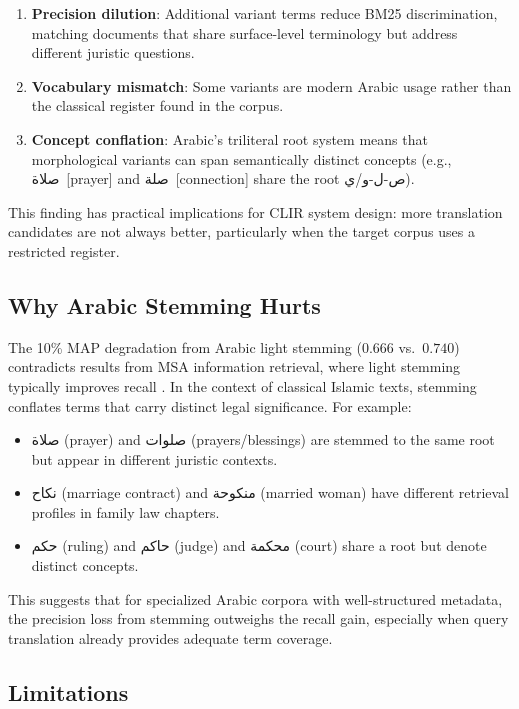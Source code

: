 \documentclass[preprint,12pt,authoryear]{elsarticle}
\begin{document}
\begin{enumerate}
    \item \textbf{Precision dilution}: Additional variant terms reduce BM25 discrimination, matching documents that share surface-level terminology but address different juristic questions.

    \item \textbf{Vocabulary mismatch}: Some variants are modern Arabic usage rather than the classical register found in the corpus.

    \item \textbf{Concept conflation}: Arabic's triliteral root system means that morphological variants can span semantically distinct concepts (e.g., صلاة~[prayer] and صلة~[connection] share the root ص-ل-و/ي).
\end{enumerate}

This finding has practical implications for CLIR system design: more translation candidates are not always better, particularly when the target corpus uses a restricted register.

\subsection{Why Arabic Stemming Hurts}

The 10\% MAP degradation from Arabic light stemming ($0.666$ vs.\ $0.740$) contradicts results from MSA information retrieval, where light stemming typically improves recall \citep{larkey2007light}. In the context of classical Islamic texts, stemming conflates terms that carry distinct legal significance. For example:

\begin{itemize}
    \item صلاة (prayer) and صلوات (prayers/blessings) are stemmed to the same root but appear in different juristic contexts.
    \item نكاح (marriage contract) and منكوحة (married woman) have different retrieval profiles in family law chapters.
    \item حكم (ruling) and حاكم (judge) and محكمة (court) share a root but denote distinct concepts.
\end{itemize}

This suggests that for specialized Arabic corpora with well-structured metadata, the precision loss from stemming outweighs the recall gain, especially when query translation already provides adequate term coverage.

\subsection{Limitations}
\end{document}
